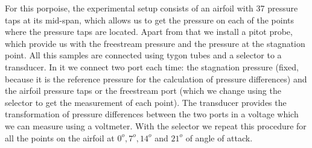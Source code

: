 \documentclass[10pt]{SelfArx} %
\begin{document}
For this porpoise, the experimental setup consists of an airfoil with 37 pressure taps at its mid-span, which allows us to get the pressure on each of the points where the pressure taps are located. Apart from that we install a pitot probe, which provide us with the freestream pressure and the pressure at the stagnation point. All this samples are connected using tygon tubes and a selector to a transducer. In it we connect two port each time: the stagnation pressure (fixed, because it is the reference pressure for the calculation of pressure differences) and the airfoil pressure taps or the freestream port (which we change using the selector to get the measurement of each point).
The transducer provides the transformation of pressure differences between the two ports in a voltage which we can measure using a voltmeter. With the selector we repeat this procedure for all the points on the airfoil at $0^{o}, 7^{o}, 14^{o}$ and $21^{o}$ of angle of attack.
\end{document}
